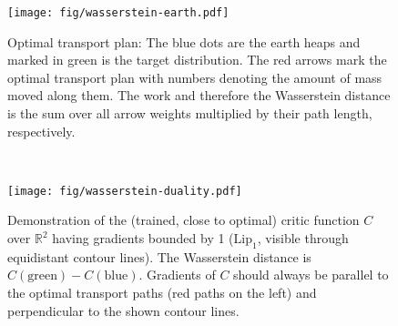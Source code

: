 \begin{figure}
\begin{minipage}{0.47\textwidth}
\texttt{[image: fig/wasserstein-earth.pdf]}
\caption{Optimal transport plan: The blue dots are the earth heaps and marked in green is the target distribution. The red arrows mark the optimal transport plan with numbers denoting the amount of mass moved along them. The work and therefore the Wasserstein distance is the sum over all arrow weights multiplied by their path length, respectively.}\label{fig:wasserstein-earth}
\end{minipage}
\begin{minipage}{0.06\textwidth}
\
\end{minipage}
\begin{minipage}[r]{0.47\textwidth}
\texttt{[image: fig/wasserstein-duality.pdf]}
\caption{Demonstration of the (trained, close to optimal) critic function \(C\) over \(\mathbb{R}^2\) having gradients bounded by 1 (\(\text{Lip}_1\), visible through equidistant contour lines). The Wasserstein distance is \(C(\text{green}) - C(\text{blue})\). Gradients of \(C\) should always be parallel to the optimal transport paths (red paths on the left) and perpendicular to the shown contour lines.}\label{fig:wasserstein-duality}
\end{minipage}
\end{figure}


